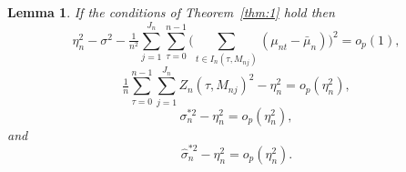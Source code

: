 \documentclass[11pt]{article}
\newtheorem{lem}{Lemma}
\theoremstyle{definition}
\begin{document}
\begin{lem}\label{res:B}
  If the conditions of Theorem~\ref{thm:1} hold then
  \begin{equation}
    \label{eq:38}
    \eta_n^2 - \sigma^2 - \tfrac{1}{n^2} \sum_{j=1}^{J_n} \sum_{\tau=0}^{n-1} \Big(\sum_{t \in I_n(\tau, M_{nj})} (\mu_{nt} - \bar{\mu}_n) \Big)^2 = o_p(1),
  \end{equation}
  \begin{equation}
    \label{eq:19}
    \tfrac{1}{n} \sum_{\tau=0}^{n-1} \sum_{j=1}^{J_n} Z_n(\tau,
    M_{nj})^2 -\eta_n^2 = o_p(\eta_n^2),
  \end{equation}
  \begin{equation}\label{eq:37}
    \sigma_n^{*2} - \eta_n^2 = o_p(\eta_n^2),
  \end{equation}
  and
  \begin{equation}
    \label{eq:36}
    \hat\sigma_n^{*2} - \eta_n^2 = o_p(\eta_n^2).
  \end{equation}
\end{lem}
\end{document}
